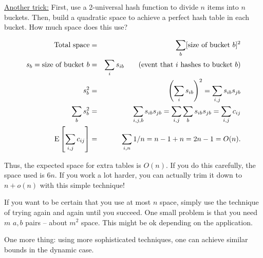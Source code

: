 \documentclass{article}
\newcommand{\E}[1]{\textnormal{E}\left[ #1 \right]}
\begin{document}
\underline{Another trick:}  First, use a 2-universal hash function to divide $n$ items into $n$ buckets.  Then, build a quadratic space to achieve a perfect hash table in each bucket.  How much space does this use?

\begin{eqnarray*}
\hbox{Total space} & = & \sum_b [\hbox{size of bucket } b] ^2 \\
s_b = \hbox{size of bucket } b & = & \sum_i s_{ib} \qquad\hbox{(event that $i$ hashes to bucket $b$)} \\
s_b^2 & = & \left( \sum_i s_{ib}\right)^2= \sum_{i,j} s_{ib}s_{jb} \\
\sum_b s_b^2 & = & \sum_{i,j,b} s_{ib}s_{jb} = \sum_{i,j}\sum_b s_{ib}s_{jb} = \sum_{i,j} c_{ij} \\
\E{\sum_{i,j}c_{ij}} & = & \sum_{i,n}1/n = n - 1 + n = 2n - 1 = O(n).
\end{eqnarray*}

Thus, the expected space for extra tables is $O(n)$.  If you do this carefully, the space used is $6n$. If you work a lot harder, you can actually trim it down to $n + o(n)$ with this simple technique!

If you want to be certain that you use at most $n$ space, simply use the technique of trying again and again until you succeed.  One small problem is that you need $m$ $a,b$ pairs -- about $m^2$ space.  This might be ok depending on the application.

One more thing: using more sophisticated techniques, one can achieve similar bounds in the dynamic case.
\end{document}
